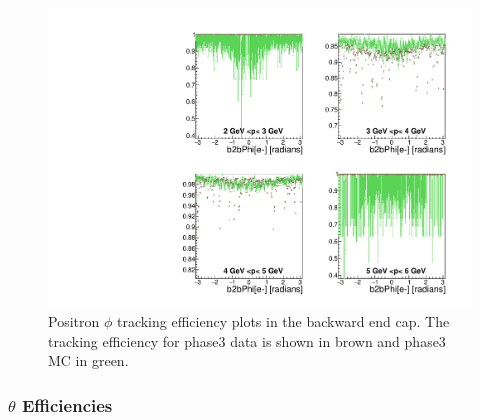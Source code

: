 \documentclass[a4paper,11pt,twosided,final,german,openbib,pdftex,listof=totoc,bibliography=totoc]{scrbook}
\begin{document}
\begin{figure}[!htbp]
	\centering
	\includegraphics[width=\textwidth]{Plots/master3/xPMPhiepECP3}
	\caption[Momentum $\phi$ Positron Backward End Cap Efficiency Phase3]{Positron $\phi$ tracking efficiency plots in the backward end cap. The tracking efficiency for phase3 data is shown in brown and phase3 MC in green.}
	
	\label{plt:xPMPhiepEC3}
\end{figure}






\newpage

\subsubsection{$\theta$ Efficiencies}
\end{document}
